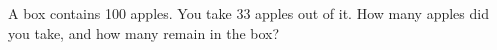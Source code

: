A box contains 100 apples. You take 33 apples out of it. How many apples did you take, and how many remain in the box?
